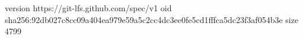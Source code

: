 version https://git-lfs.github.com/spec/v1
oid sha256:92db027c8cc09a404ea979e59a5c2cc4dc3ee0fe5cd1fffca5dc23f3af054b3e
size 4799
